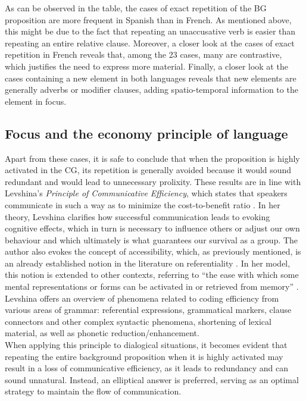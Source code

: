  As can be observed in the table, the cases of exact repetition of the BG proposition are more frequent in Spanish than in French. As mentioned above, this might be due to the fact that repeating an unaccusative verb is easier than repeating an entire relative clause. Moreover, a closer look at the cases of exact repetition in French reveals that, among the 23 cases, many are contrastive, which justifies the need to express more material. Finally, a closer look at the cases containing a new element in both languages reveals that new elements are generally adverbs or modifier clauses, adding spatio-temporal information to the element in focus.

\subsection{Focus and the economy principle of language}
Apart from these cases, it is safe to conclude that when the proposition is highly activated in the CG, its repetition is generally avoided because it would sound redundant and would lead to unnecessary prolixity. These results are in line with Levshina's \textit{Principle of Communicative Efficiency}, which states that speakers communicate in such a way as to minimize the cost-to-benefit ratio \parencite[30]{Levshina_2022}. In her theory, Levshina clarifies how successful communication leads to evoking cognitive effects, which in turn is necessary to influence others or adjust our own behaviour and which ultimately is what guarantees our survival as a group. The author also evokes the concept of accessibility, which, as previously mentioned, is an already established notion in the literature on referentiality \parencite{ariel2001accessibility, arnold2007effect}. In her model, this notion is extended to other contexts, referring to ``the ease with which some mental representations or forms can be activated in or retrieved from memory” \parencite[18]{Levshina_2022}. Levshina offers an overview of phenomena related to coding efficiency from various areas of grammar: referential expressions, grammatical markers, clause connectors and other complex syntactic phenomena, shortening of lexical material, as well as phonetic reduction/enhancement. \\
When applying this principle to dialogical situations, it becomes evident that repeating the entire background proposition when it is highly activated may result in a loss of communicative efficiency, as it leads to redundancy and can sound unnatural. Instead, an elliptical answer is preferred, serving as an optimal strategy to maintain the flow of communication.
